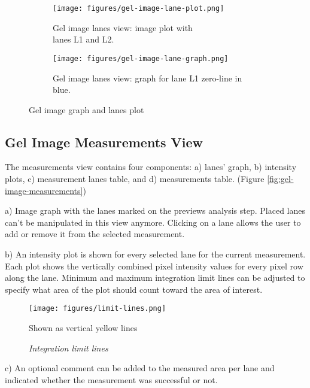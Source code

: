\begin{figure}[H]
    \centering
    \begin{subfigure}{.5\textwidth}
        \centering
        \texttt{[image: figures/gel-image-lane-plot.png]}
        \caption{Gel image lanes view: image plot with \\
        lanes L1 and L2.}
        \label{fig:sub-gel-image-lane-plot}
    \end{subfigure}%
    \begin{subfigure}{.5\textwidth}
        \centering
        \texttt{[image: figures/gel-image-lane-graph.png]}
        \caption{Gel image lanes view: graph for lane L1 zero-line in blue.}
        \label{fig:sub-gel-image-lane-graph}
    \end{subfigure}
    \caption{Gel image graph and lanes plot}
    \label{fig:gel-image-lane-graph-plot}
\end{figure}

\subsection{Gel Image Measurements View}

The measurements view contains four components: a) lanes' graph, b) intensity plots, c) measurement lanes table, and d) measurements table. (Figure \ref{fig:gel-image-measurements})

a) Image graph with the lanes marked on the previews analysis step. Placed lanes can't be manipulated in this view anymore.
Clicking on a lane allows the user to add or remove it from the selected measurement.

b) An intensity plot is shown for every selected lane for the current measurement.
Each plot shows the vertically combined pixel intensity values for every pixel row along the lane.
Minimum and maximum integration limit lines can be adjusted to specify what area of the plot should count toward the area of interest.

\begin{figure}[ht]
    \centering
    \texttt{[image: figures/limit-lines.png]}
    \caption[\textit{Integration limit lines}]%
    {\textit{Integration limit lines}}
    {\small {Shown as vertical yellow lines}}
    \label{fig:integration-limit-lines}
\end{figure}

c) An optional comment can be added to the measured area per lane and indicated whether the measurement was successful or not.

